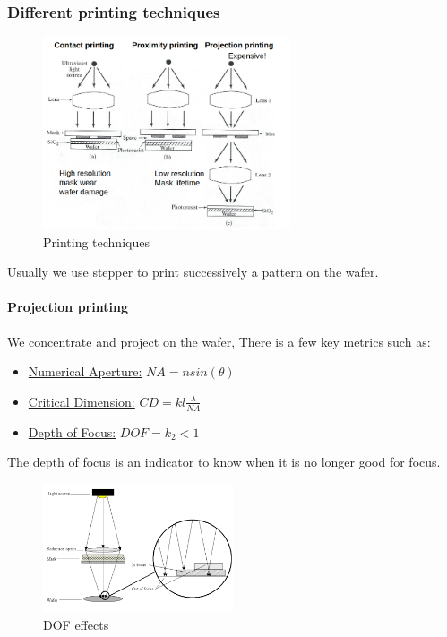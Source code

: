 \documentclass[
]{article}
\begin{document}
\hypertarget{different-printing-techniques}{%
\subsubsection{Different printing
techniques}\label{different-printing-techniques}}

\begin{figure}
\hypertarget{fig:enter-label}{%
\centering
\includegraphics[width=0.65\textwidth,height=\textheight]{printing_techniques.png}
\caption{Printing techniques}\label{fig:enter-label}
}
\end{figure}

Usually we use stepper to print successively a pattern on the wafer.

\hypertarget{projection-printing}{%
\paragraph{Projection printing}\label{projection-printing}}

We concentrate and project on the wafer, There is a few key metrics such
as:

\begin{itemize}
\item
  \ul{Numerical Aperture:} \(NA = n sin(\theta)\)
\item
  \ul{Critical Dimension:} \(CD = kl \frac{\lambda}{NA}\)
\item
  \ul{Depth of Focus:} \(DOF = k_2 < 1\)
\end{itemize}

The depth of focus is an indicator to know when it is no longer good for
focus.

\begin{figure}
\hypertarget{fig:enter-label}{%
\centering
\includegraphics[width=0.5\textwidth,height=\textheight]{DOF_effects.png}
\caption{DOF effects}\label{fig:enter-label}
}
\end{figure}
\end{document}
